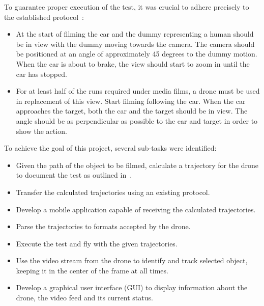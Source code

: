 To guarantee proper execution of the test, it was crucial to adhere precisely to the established protocol~\cite{EuroNCAP2021FILMPROTOCOL}: \\

\begin{itemize}
    \item At the start of filming the car and the dummy representing a human should be in view with the dummy moving towards the camera. The camera should be positioned at an angle of approximately 45 degrees to the dummy motion. When the car is about to brake, the view should start to zoom in until the car has stopped.
    \item For at least half of the runs required under media films, a drone must be used in replacement of this view. Start filming following the car. When the car approaches the target, both the car and the target should be in view. The angle should be as perpendicular as possible to the car and target in order to show the action. \\
\end{itemize}
To achieve the goal of this project, several sub-tasks were identified: \\
\begin{itemize}
    \item Given the path of the object to be filmed, calculate a trajectory for the drone to document the test as outlined in~\cite{EuroNCAP2021FILMPROTOCOL}.
    \item Transfer the calculated trajectories using an existing protocol.
    \item Develop a mobile application capable of receiving the calculated trajectories.
    \item Parse the trajectories to formats accepted by the drone.
    \item Execute the test and fly with the given trajectories.
    \item Use the video stream from the drone to identify and track selected object, keeping it in the center of the frame at all times.
    \item Develop a graphical user interface (GUI) to display information about the drone, the video feed and its current status.
\end{itemize}
